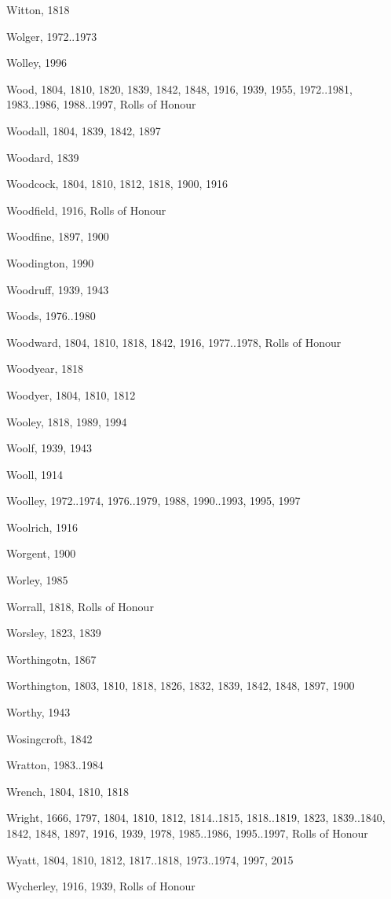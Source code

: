 \begin{theindex}
\item Witton, 1818
\item Wolger, 1972..1973
\item Wolley, 1996
\item Wood, 1804, 1810, 1820, 1839, 1842, 1848, 1916, 1939, 1955, 1972..1981, 1983..1986, 1988..1997, Rolls of Honour
\item Woodall, 1804, 1839, 1842, 1897
\item Woodard, 1839
\item Woodcock, 1804, 1810, 1812, 1818, 1900, 1916
\item Woodfield, 1916, Rolls of Honour
\item Woodfine, 1897, 1900
\item Woodington, 1990
\item Woodruff, 1939, 1943
\item Woods, 1976..1980
\item Woodward, 1804, 1810, 1818, 1842, 1916, 1977..1978, Rolls of Honour
\item Woodyear, 1818
\item Woodyer, 1804, 1810, 1812
\item Wooley, 1818, 1989, 1994
\item Woolf, 1939, 1943
\item Wooll, 1914
\item Woolley, 1972..1974, 1976..1979, 1988, 1990..1993, 1995, 1997
\item Woolrich, 1916
\item Worgent, 1900
\item Worley, 1985
\item Worrall, 1818, Rolls of Honour
\item Worsley, 1823, 1839
\item Worthingotn, 1867
\item Worthington, 1803, 1810, 1818, 1826, 1832, 1839, 1842, 1848, 1897, 1900
\item Worthy, 1943
\item Wosingcroft, 1842
\item Wratton, 1983..1984
\item Wrench, 1804, 1810, 1818
\item Wright, 1666, 1797, 1804, 1810, 1812, 1814..1815, 1818..1819, 1823, 1839..1840, 1842, 1848, 1897, 1916, 1939, 1978, 1985..1986, 1995..1997, Rolls of Honour
\item Wyatt, 1804, 1810, 1812, 1817..1818, 1973..1974, 1997, 2015
\item Wycherley, 1916, 1939, Rolls of Honour

\end{theindex}
